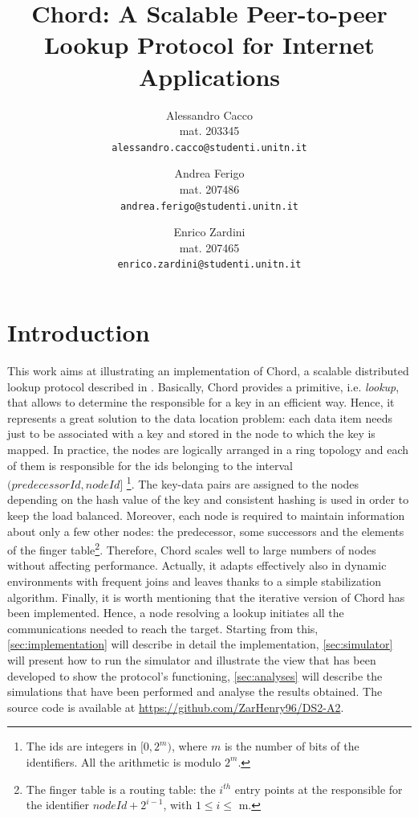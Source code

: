 \documentclass[11pt,twocolumn,letterpaper]{article}
\begin{document}
	
	\title{Chord: A Scalable Peer-to-peer Lookup Protocol for Internet Applications}
	
	\author{Alessandro Cacco\\
		mat. 203345\\
		{\tt\small alessandro.cacco@studenti.unitn.it}
		\and
		Andrea Ferigo\\
		mat. 207486\\
		{\tt\small andrea.ferigo@studenti.unitn.it}
		\and
		Enrico Zardini\\
		mat. 207465\\
		{\tt\small enrico.zardini@studenti.unitn.it}
	}
	\date{}
	\maketitle
	
	\section{Introduction}
	\label{sec:intro}
	This work aims at illustrating an implementation of Chord, a scalable distributed lookup protocol described in \cite{chord}. Basically, Chord provides a primitive, i.e. \textit{lookup}, that allows to determine the responsible for a key in an efficient way. Hence, it represents a great solution to the data location problem: each data item needs just to be associated with a key and stored in the node to which the key is mapped. \newline 
	In practice, the nodes are logically arranged in a ring topology and each of them is responsible for the ids belonging to the interval $(predecessorId, nodeId]$ \footnote{The ids are integers in $[0,2^m)$, where $m$ is the number of bits of the identifiers. All the arithmetic is modulo $2^m$.}. The key-data pairs are assigned to the nodes depending on the hash value of the key and consistent hashing is used in order to keep the load balanced. Moreover, each node is required to maintain information about only a few other nodes: the predecessor, some successors and the elements of the finger table\footnote{The finger table is a routing table: the $i^{th}$ entry points at the responsible for the identifier $nodeId+2^{i-1}$, with $1\leq i \leq$ m.\label{foot:ftable}}. Therefore, Chord scales well to large numbers of nodes without affecting performance. Actually, it adapts effectively also in dynamic environments with frequent joins and leaves thanks to a simple stabilization algorithm. \newline
	Finally, it is worth mentioning that the iterative version of Chord has been implemented. Hence, a node resolving a lookup initiates all the communications needed to reach the target. \newline
	Starting from this, \cref{sec:implementation} will describe in detail the implementation, \cref{sec:simulator} will present how to run the simulator and illustrate the view that has been developed to show the protocol's functioning, \cref{sec:analyses} will describe the simulations that have been performed and analyse the results obtained. \newline
	The source code is available at \url{https://github.com/ZarHenry96/DS2-A2}. 
	
\end{document}
